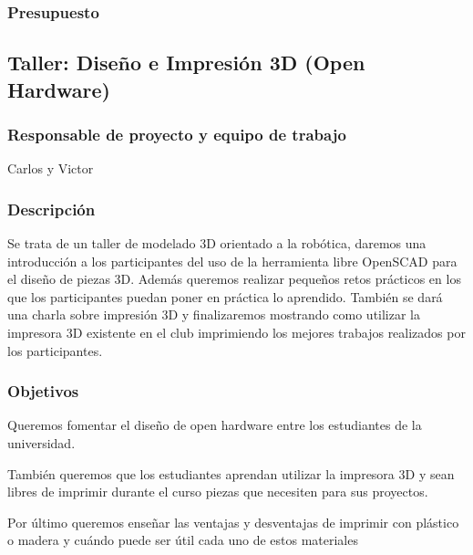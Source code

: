 \documentclass[12pt,twoside]{report}
\begin{document}
\subsubsection{Presupuesto}


\subsection{Taller: Diseño e Impresión 3D (Open Hardware)}
\subsubsection{Responsable de proyecto y equipo de trabajo}
Carlos y Victor
\subsubsection{Descripción}
Se trata de un taller de modelado 3D orientado a la robótica, daremos una introducción a los participantes del uso de la herramienta libre OpenSCAD para el diseño de piezas 3D. Además queremos realizar pequeños retos prácticos en los que los participantes puedan poner en práctica lo aprendido. También se dará una charla sobre impresión 3D y finalizaremos mostrando como utilizar la impresora 3D existente en el club imprimiendo los mejores trabajos realizados por los participantes.
\subsubsection{Objetivos}
Queremos fomentar el diseño de open hardware entre los estudiantes de la universidad.

También queremos que los estudiantes aprendan utilizar la impresora 3D y sean libres de imprimir durante el curso piezas que necesiten para sus proyectos.

Por último queremos enseñar las ventajas y desventajas de imprimir con plástico o madera y cuándo puede ser útil cada uno de estos materiales
\end{document}
